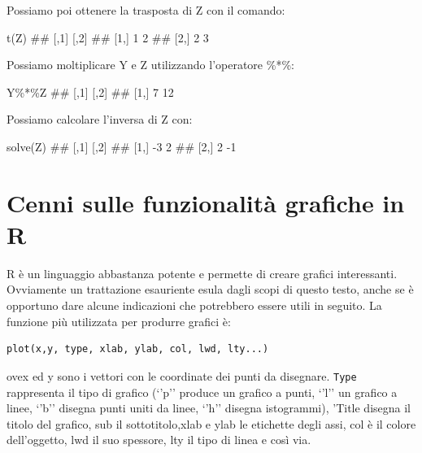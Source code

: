 \documentclass[a4paper,12pt,oneside]{book}
\newenvironment{Shaded}{\begin{snugshade}}{\end{snugshade}}
\newcommand{\SpecialCharTok}[1]{#1}
\newcommand{\DocumentationTok}[1]{#1}
\newcommand{\FunctionTok}[1]{#1}
\newcommand{\NormalTok}[1]{#1}
\begin{document}
Possiamo poi ottenere la trasposta di Z con il comando:

\begin{Shaded}
\begin{Highlighting}[]
\FunctionTok{t}\NormalTok{(Z)}
\DocumentationTok{\#\#      [,1] [,2]}
\DocumentationTok{\#\# [1,]    1    2}
\DocumentationTok{\#\# [2,]    2    3}
\end{Highlighting}
\end{Shaded}

Possiamo moltiplicare Y e Z utilizzando l'operatore \%*\%:

\begin{Shaded}
\begin{Highlighting}[]
\NormalTok{Y}\SpecialCharTok{\%*\%}\NormalTok{Z}
\DocumentationTok{\#\#      [,1] [,2]}
\DocumentationTok{\#\# [1,]    7   12}
\end{Highlighting}
\end{Shaded}

Possiamo calcolare l'inversa di Z con:

\begin{Shaded}
\begin{Highlighting}[]
\FunctionTok{solve}\NormalTok{(Z)}
\DocumentationTok{\#\#      [,1] [,2]}
\DocumentationTok{\#\# [1,]   {-}3    2}
\DocumentationTok{\#\# [2,]    2   {-}1}
\end{Highlighting}
\end{Shaded}

\hypertarget{cenni-sulle-funzionalituxe0-grafiche-in-r}{%
\section*{Cenni sulle funzionalità grafiche in R}\label{cenni-sulle-funzionalituxe0-grafiche-in-r}}

R è un linguaggio abbastanza potente e permette di creare grafici interessanti. Ovviamente un trattazione esauriente esula dagli scopi di questo testo, anche se è opportuno dare alcune indicazioni che potrebbero essere utili in seguito.
La funzione più utilizzata per produrre grafici è:

\begin{verbatim}
plot(x,y, type, xlab, ylab, col, lwd, lty...)
\end{verbatim}

ovex ed y sono i vettori con le coordinate dei punti da disegnare. \texttt{Type} rappresenta il tipo di grafico (`'p'' produce un grafico a punti, `'l'' un grafico a linee, `'b'' disegna punti uniti da linee, `'h'' disegna istogrammi), 'Title disegna il titolo del grafico, sub il sottotitolo,xlab e ylab le etichette degli assi, col è il colore dell'oggetto, lwd il suo spessore, lty il tipo di linea e così via.
\end{document}
